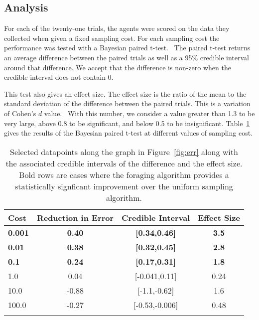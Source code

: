 \subsection{Analysis}

For each of the twenty-one trials, the agents were scored on the data they collected when given a fixed sampling cost.  For each sampling cost the performance was tested with a Bayesian paired t-test.~\cite{baath2014bayesian}  The paired t-test returns an average difference between the paired trials as well as a 95\% credible interval around that difference.  We accept that the difference is non-zero when the credible interval does not contain 0.  

This test also gives an effect size.  The effect size is the ratio of the mean to the standard deviation of the difference between the paired trials.  This is a variation of Cohen's $d$ value.~\cite{cohen2013statistical}  With this number, we consider a value greater than 1.3 to be very large, above 0.8 to be significant, and below 0.5 to be insignificant.  Table~\ref{tbl:ttest} gives the results of the Bayesian paired t-test at different values of sampling cost.

\begin{table}[t!]%
	\centering
	\begin{tabular}{lccc}
		Cost & Reduction in Error & Credible Interval & Effect Size \\
		\hline
		\textbf{0.001} & \textbf{0.40} & \textbf{[0.34,0.46]} & \textbf{3.5}\\
		\textbf{0.01} & \textbf{0.38} & \textbf{[0.32,0.45]} & \textbf{2.8}\\
		\textbf{0.1} & \textbf{0.24} & \textbf{[0.17,0.31]} & \textbf{1.8}\\
		1.0 & 0.04 & [-0.041,0.11] & 0.24\\
		10.0 & -0.88 & [-1.1,-0.62] & 1.6\\
		100.0 & -0.27 & [-0.53,-0.006] & 0.48\\
		\hline \\
	\end{tabular}
	\caption{Selected datapoints along the graph in Figure~\ref{fig:err} along with the associated credible intervals of the difference and the effect size.  Bold rows are cases where the foraging algorithm provides a statistically signficant improvement over the uniform sampling algorithm.}
	\label{tbl:ttest}
\end{table}
